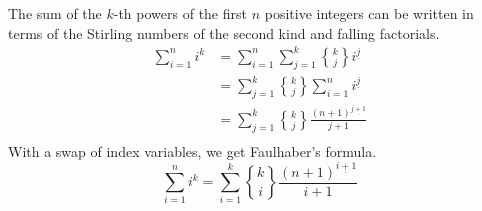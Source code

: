 \documentclass[12pt]{article}
\theoremstyle{definition}
\begin{document}
The sum of the $k$-th powers of the first $n$ positive integers can be written in terms of the Stirling numbers of the second kind and falling factorials.
\begin{align*}
    \sum_{i=1}^n i^k & = \sum_{i=1}^n \sum_{j=1}^k {k\brace j} i^{\underline{j}}      \\
                     & = \sum_{j=1}^k {k\brace j} \sum_{i=1}^n i^{\underline{j}}      \\
                     & = \sum_{j=1}^k {k\brace j} \frac{(n+1)^{\underline{j+1}}}{j+1} \\
\end{align*}
With a swap of index variables, we get Faulhaber's formula.
\begin{equation}
    \sum_{i=1}^n i^k = \sum_{i=1}^k {k\brace i} \frac{(n+1)^{\underline{i+1}}}{i+1}
\end{equation}
\end{document}
